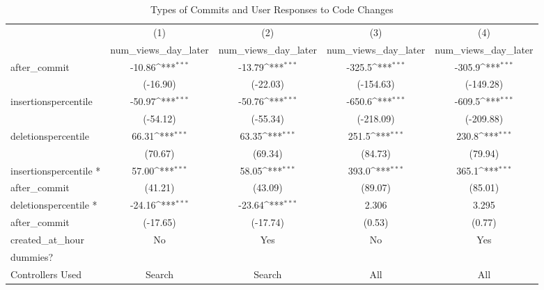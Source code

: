 \documentclass[10pt]{article}
\begin{document}
\begin{table}
\centering
\caption{Types of Commits and User Responses to Code Changes}
{
    \def\sym#1{\ifmmode^{#1}\else\(^{#1}\)\fi}
    \begin{tabular}{l*{4}{c}}
    \hline\hline
        &\multicolumn{1}{c}{(1)}&\multicolumn{1}{c}{(2)}&\multicolumn{1}{c}{(3)}&\multicolumn{1}{c}{(4)}\\
        &\multicolumn{1}{c}{num\_views\_day\_later}&\multicolumn{1}{c}{num\_views\_day\_later}&\multicolumn{1}{c}{num\_views\_day\_later}&\multicolumn{1}{c}{num\_views\_day\_later}\\
        \hline
        after\_commit&      -10.86\sym{***}&      -13.79\sym{***}&      -325.5\sym{***}&      -305.9\sym{***}\\
        &    (-16.90)         &    (-22.03)         &   (-154.63)         &   (-149.28)         \\
        [1em]
        insertionspercentile&      -50.97\sym{***}&      -50.76\sym{***}&      -650.6\sym{***}&      -609.5\sym{***}\\
        &    (-54.12)         &    (-55.34)         &   (-218.09)         &   (-209.88)         \\
        [1em]
        deletionspercentile&       66.31\sym{***}&       63.35\sym{***}&       251.5\sym{***}&       230.8\sym{***}\\
        &     (70.67)         &     (69.34)         &     (84.73)         &     (79.94)         \\
        [1em]
        insertionspercentile *&       57.00\sym{***}&       58.05\sym{***}&       393.0\sym{***}&       365.1\sym{***}\\
        after\_commit&     (41.21)         &     (43.09)         &     (89.07)         &     (85.01)         \\
        [1em]
        deletionspercentile * &      -24.16\sym{***}&      -23.64\sym{***}&       2.306         &       3.295         \\
        after\_commit&    (-17.65)         &    (-17.74)         &      (0.53)         &      (0.77)         \\
        [1em]
        created\_at\_hour&      No               &    Yes &          No           &     Yes\\
        dummies?&                     &            &                     &      \\
        [1em]
        Controllers Used&      Search               &    Search &         All           &     All\\

\end{tabular}}
\end{table}
\end{document}
